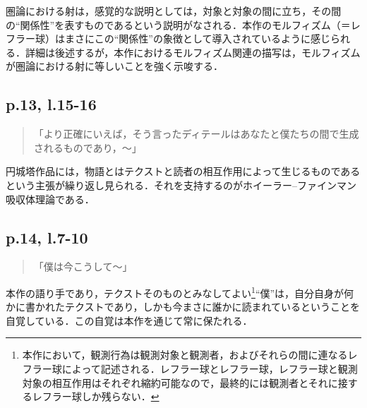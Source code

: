 \documentclass[10pt, a5paper, twoside]{jsarticle}
\theoremstyle{definition}
\begin{document}
                圏論における射は，感覚的な説明としては，対象と対象の間に立ち，その間の“関係性”を表すものであるという説明がなされる．本作のモルフィズム（＝レフラー球）はまさにこの“関係性”の象徴として導入されているように感じられる．詳細は後述するが，本作におけるモルフィズム関連の描写は，モルフィズムが圏論における射に等しいことを強く示唆する．

            \subsection{p.13, l.15-16}

                \begin{quote}

                    「より正確にいえば，そう言ったディテールはあなたと僕たちの間で生成されるものであり，〜」

                \end{quote}

                円城塔作品には，物語とはテクストと読者の相互作用によって生じるものであるという主張が繰り返し見られる．それを支持するのがホイーラー--ファインマン吸収体理論である．

            \subsection{p.14, l.7-10}

                \begin{quote}

                    「僕は今こうして〜」

                \end{quote}

                本作の語り手であり，テクストそのものとみなしてよい\footnote{本作において，観測行為は観測対象と観測者，およびそれらの間に連なるレフラー球によって記述される．レフラー球とレフラー球，レフラー球と観測対象の相互作用はそれぞれ縮約可能なので，最終的には観測者とそれに接するレフラー球しか残らない．}“僕”は，自分自身が何かに書かれたテクストであり，しかも今まさに誰かに読まれているということを自覚している．この自覚は本作を通じて常に保たれる．
\end{document}
